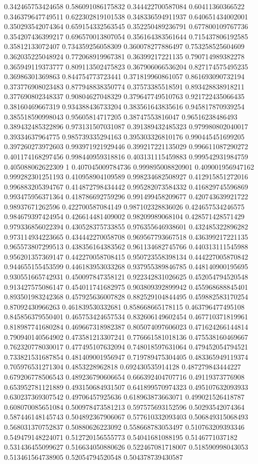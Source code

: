 \begin{table}
\begin{tabu}
\begin{sparkline}{10}
0.342465753424658 0.586091086175832 0.344422700587084 0.60411360366522 0.346379647749511 0.622302819101538 0.348336594911937 0.640651434002001 0.350293542074364 0.659154332563545 0.352250489236791 0.677800109767736 0.354207436399217 0.696570013807054 0.356164383561644 0.715437806192585 0.35812133072407 0.734359256058309 0.360078277886497 0.753258525604609 0.362035225048924 0.772068919967381 0.36399217221135 0.790714989382278 0.365949119373777 0.809113502475823 0.367906066536204 0.827174575495235 0.36986301369863 0.844754773723441 0.371819960861057 0.861693090732194 0.373776908023483 0.877948838350774 0.37573385518591 0.893428838918211 0.377690802348337 0.90804627048329 0.379647749510763 0.921722435066435 0.38160469667319 0.934388436733204 0.383561643835616 0.945817870939254 0.385518590998043 0.95605814717205 0.38747553816047 0.96516238486493 0.389432485322896 0.973131507031087 0.391389432485323 0.979980802040017 0.39334637964775 0.985739335294163 0.395303326810176 0.990445451699205 0.397260273972603 0.993971921929446 0.399217221135029 0.996611087290272 0.401174168297456 0.998440959318816 0.403131115459883 0.999542931984759 0.405088062622309 1 0.407045009784736 0.999895008820901 0.409001956947162 0.999282301251193 0.410958904109589 0.998234682508927 0.412915851272016 0.996883205394767 0.414872798434442 0.995282073584332 0.416829745596869 0.993475956371364 0.418786692759296 0.991499458209677 0.420743639921722 0.98937671262596 0.422700587084149 0.987102328836026 0.424657534246575 0.984679397424954 0.426614481409002 0.98209989068104 0.428571428571429 0.979336856022394 0.430528375733855 0.976355646938601 0.432485322896282 0.973114934223665 0.434442270058708 0.969567793667518 0.436399217221135 0.965573807299513 0.438356164383562 0.961134682745766 0.440313111545988 0.956201357369147 0.442270058708415 0.950723558398134 0.444227005870842 0.944655155453599 0.446183953033268 0.937955389846785 0.448140900195695 0.930551665742931 0.450097847358121 0.922342831026625 0.452054794520548 0.913427575086147 0.454011741682975 0.903809392899942 0.455968688845401 0.893501983242368 0.457925636007828 0.882529104844495 0.459882583170254 0.87092430966263 0.461839530332681 0.858668665178115 0.463796477495108 0.845856379550401 0.465753424657534 0.832606149602454 0.467710371819961 0.818987741680284 0.469667318982387 0.805074097606023 0.471624266144814 0.790940140564902 0.473581213307241 0.776661581018136 0.475538160469667 0.762320778030017 0.477495107632094 0.748018597631064 0.479452054794521 0.733821531687854 0.481409001956947 0.719789475304405 0.483365949119374 0.705976531271304 0.4853228962818 0.692430535914128 0.487279843444227 0.679206778506543 0.489236790606654 0.666392404707716 0.49119373776908 0.653952781121889 0.493150684931507 0.641899570974323 0.495107632093933 0.630237369307542 0.49706457925636 0.618963873663071 0.499021526418787 0.608070085651084 0.500978473581213 0.597575693152596 0.50293542074364 0.587446148145743 0.504892367906067 0.577610332093403 0.506849315068493 0.568031370752837 0.50880626223092 0.558668783053497 0.510763209393346 0.549479148224071 0.512720156555773 0.54041681088195 0.5146771037182 0.531436455099627 0.516634050880626 0.522467081718007 0.518590998043053 0.513461564738905 0.52054794520548 0.504378739430587 
\end{sparkline}
\end{tabu}
\end{table}
